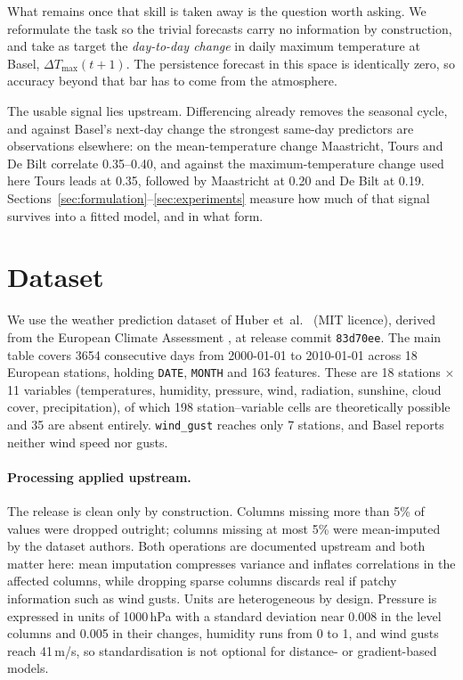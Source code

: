 \documentclass[11pt,a4paper]{article}
\newcommand{\dmax}{\Delta T_{\max}}
\begin{document}
What remains once that skill is taken away is the question worth asking. We reformulate the task so the trivial forecasts carry no information by construction, and take as target the \emph{day-to-day change} in daily maximum temperature at Basel, $\dmax(t{+}1)$. The persistence forecast in this space is identically zero, so accuracy beyond that bar has to come from the atmosphere.

The usable signal lies upstream. Differencing already removes the seasonal cycle, and against Basel's next-day
change the strongest same-day predictors are observations elsewhere: on the mean-temperature change Maastricht, Tours and
De Bilt correlate 0.35--0.40, and against the maximum-temperature change used here Tours leads at 0.35, followed by
Maastricht at 0.20 and De Bilt at 0.19. Sections~\ref{sec:formulation}--\ref{sec:experiments} measure how much of that
signal survives into a fitted model, and in what form.

\section{Dataset}
\label{sec:dataset}

We use the weather prediction dataset of Huber et~al.~\cite{huber2023} (MIT licence), derived from the European Climate Assessment \cite{kleintank2002}, at release commit \texttt{83d70ee}. The main table covers 3654 consecutive days from 2000-01-01 to 2010-01-01 across 18 European stations, holding \texttt{DATE}, \texttt{MONTH} and 163 features. These are 18 stations $\times$ 11 variables (temperatures, humidity, pressure, wind, radiation, sunshine, cloud cover, precipitation), of which 198 station--variable cells are theoretically possible and 35 are absent entirely. \texttt{wind\_gust} reaches only 7 stations, and Basel reports neither wind speed nor gusts.

\paragraph{Processing applied upstream.}
The release is clean only by construction. Columns missing more than 5\% of values were dropped outright; columns missing at most 5\% were mean-imputed by the dataset authors. Both operations are documented upstream and both matter here: mean imputation compresses variance and inflates correlations in the affected columns, while dropping sparse columns discards real if patchy information such as wind gusts. Units are heterogeneous by design. Pressure is expressed in units of 1000\,hPa with a standard deviation near 0.008 in the level columns and 0.005 in their changes, humidity runs from 0 to 1, and wind gusts reach 41\,m/s, so standardisation is not optional for distance- or gradient-based models.
\end{document}

